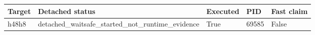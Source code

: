 {\small
\begin{tabular}{lllll}
\hline
Target & Detached status & Executed & PID & Fast claim \\
\hline
h48h8 & detached\_waitsafe\_started\_not\_runtime\_evidence & True & 69585 & False \\
\hline
\end{tabular}
}
